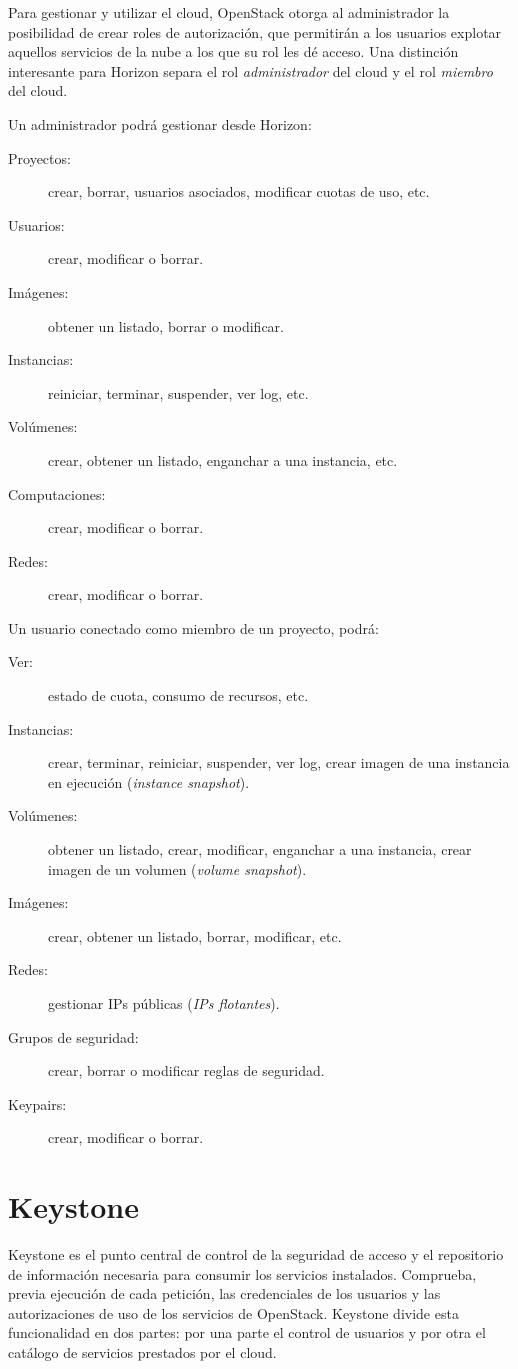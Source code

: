 Para gestionar y utilizar el cloud, OpenStack otorga al administrador la posibilidad de crear roles de autorizaci\'on, que permitir\'an a los usuarios explotar aquellos servicios de la nube a los que su rol les d\'e acceso. Una distinci\'on interesante para Horizon separa el rol \emph{administrador} del cloud y el rol \emph{miembro} del cloud. \newline

Un administrador podr\'a gestionar desde Horizon:

\begin{description}
 \item[Proyectos:] crear, borrar, usuarios asociados, modificar cuotas de uso, etc.
 \item[Usuarios:] crear, modificar o borrar.
 \item[Im\'agenes:] obtener un listado, borrar o modificar.
 \item[Instancias:] reiniciar, terminar, suspender, ver log, etc.
 \item[Vol\'umenes:] crear, obtener un listado, enganchar a una instancia, etc.
 \item[Computaciones:] crear, modificar o borrar.
 \item[Redes:] crear, modificar o borrar.
\end{description}

Un usuario conectado como miembro de un proyecto, podr\'a:

\begin{description}
 \item[Ver:] estado de cuota, consumo de recursos, etc.
 \item[Instancias:] crear, terminar, reiniciar, suspender, ver log, crear imagen de una instancia en ejecuci\'on (\emph{instance snapshot}).
 \item[Vol\'umenes:] obtener un listado, crear, modificar, enganchar a una instancia, crear imagen de un volumen (\emph{volume snapshot}).
 \item[Im\'agenes:] crear, obtener un listado, borrar, modificar, etc.
 \item[Redes:] gestionar IPs p\'ublicas (\emph{IPs flotantes}).
 \item[Grupos de seguridad:] crear, borrar o modificar reglas de seguridad.
 \item[Keypairs:] crear, modificar o borrar.
\end{description}


\section{Keystone}\label{sec:keystone}
\noindent Keystone es el punto central de control de la seguridad de acceso y el re\-po\-si\-to\-rio de informaci\'on necesaria para consumir los servicios instalados. Comprueba, previa ejecuci\'on de cada petici\'on, las credenciales de los usuarios y las autorizaciones de uso de los servicios de OpenStack. Keystone divide esta funcionalidad en dos partes: por una parte el control de usuarios y por otra el cat\'alogo de servicios prestados por el cloud.\newline

